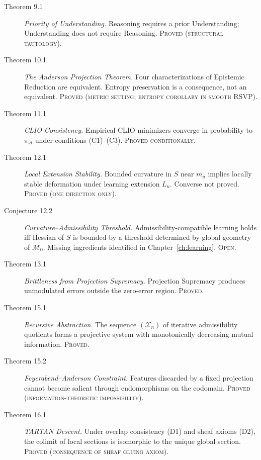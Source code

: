 \documentclass[12pt, a4paper, oneside]{book}
\newcommand{\Adm}{\mathcal{A}}
\newcommand{\X}{\mathcal{X}}
\newcommand{\M}{\mathcal{M}}
\newcommand{\projA}{\pi_{\!\Adm}}
\newcommand{\Ent}{S}
\begin{document}
\begin{description}
\item[Theorem 9.1] \textit{Priority of Understanding.}
  Reasoning requires a prior Understanding; Understanding does not
  require Reasoning. \textsc{Proved (structural tautology).}

\item[Theorem 10.1] \textit{The Anderson Projection Theorem.}
  Four characterizations of Epistemic Reduction are equivalent.
  Entropy preservation is a consequence, not an equivalent.
  \textsc{Proved (metric setting; entropy corollary in smooth RSVP).}

\item[Theorem 11.1] \textit{CLIO Consistency.}
  Empirical CLIO minimizers converge in probability to $\projA$ under
  conditions (C1)--(C3). \textsc{Proved conditionally.}

\item[Theorem 12.1] \textit{Local Extension Stability.}
  Bounded curvature in $\Ent$ near $m_u$ implies locally stable
  deformation under learning extension $L_u$.
  Converse not proved. \textsc{Proved (one direction only).}

\item[Conjecture 12.2] \textit{Curvature--Admissibility Threshold.}
  Admissibility-compatible learning holds iff Hessian of $\Ent$ is
  bounded by a threshold determined by global geometry of $\M_0$.
  Missing ingredients identified in Chapter~\ref{ch:learning}.
  \textsc{Open.}

\item[Theorem 13.1] \textit{Brittleness from Projection Supremacy.}
  Projection Supremacy produces unmodulated errors outside the
  zero-error region. \textsc{Proved.}

\item[Theorem 15.1] \textit{Recursive Abstraction.}
  The sequence $(\X_n)$ of iterative admissibility quotients forms a
  projective system with monotonically decreasing mutual information.
  \textsc{Proved.}

\item[Theorem 15.2] \textit{Feyerabend--Anderson Constraint.}
  Features discarded by a fixed projection cannot become salient through
  endomorphisms on the codomain.
  \textsc{Proved (information-theoretic impossibility).}

\item[Theorem 16.1] \textit{TARTAN Descent.}
  Under overlap consistency (D1) and sheaf axioms (D2), the colimit
  of local sections is isomorphic to the unique global section.
  \textsc{Proved (consequence of sheaf gluing axiom).}


\end{description}
\end{document}
